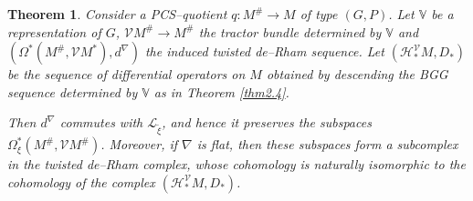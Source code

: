 \documentclass[12pt,a4paper]{amsart}
\def\Bbb{\mathbb}
\def\Cal{\mathcal}
\newcommand{\Om}{\Omega}
\newcounter{theorem}
\numberwithin{theorem}{section}
\newtheorem{thm}[theorem]{Theorem}
\theoremstyle{definition}
\theoremstyle{remark}
\begin{document}
\begin{thm}\label{thm4.1}
Consider a PCS--quotient $q:M^\#\to M$ of type $(G,P)$. Let $\Bbb V$
be a representation of $G$, $\Cal VM^\#\to M^\#$ the tractor bundle
determined by $\Bbb V$ and $(\Om^*(M^\#,\Cal VM^*),d^\nabla)$ the
induced twisted de--Rham sequence. Let $(\Cal H^{\Cal V}_*M,D_*)$ be
the sequence of differential operators on $M$ obtained by descending
the BGG sequence determined by $\Bbb V$ as in Theorem \ref{thm2.4}.

Then $d^\nabla$ commutes with $\Cal L_{\tilde\xi}$, and hence it
preserves the subspaces $\Om^*_\xi(M^\#,\Cal VM^\#)$. Moreover, if
$\nabla$ is flat, then these subspaces form a subcomplex in the twisted
de--Rham complex, whose cohomology is naturally isomorphic to the
cohomology of the complex $(\Cal H^{\Cal V}_*M,D_*)$.
\end{thm}
\end{document}
